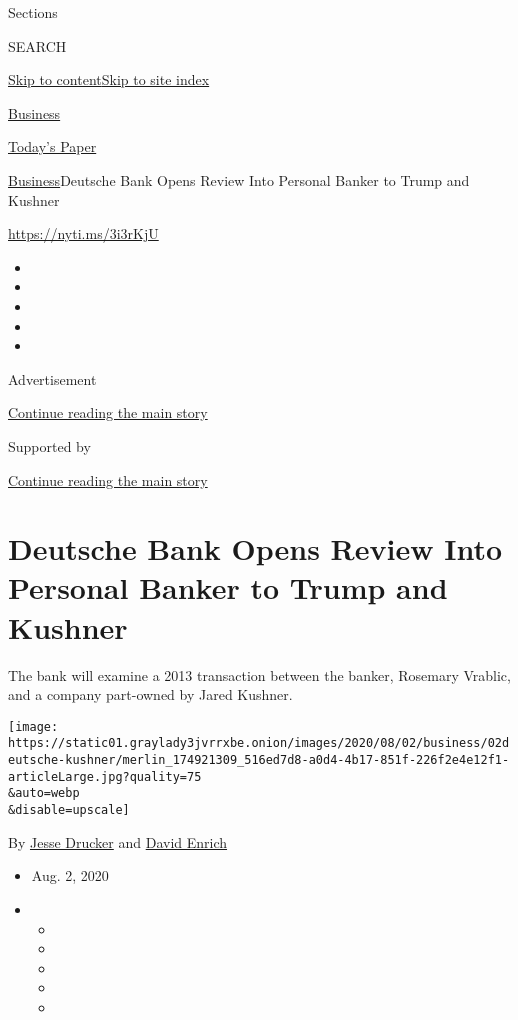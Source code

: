 Sections

SEARCH

\protect\hyperlink{site-content}{Skip to
content}\protect\hyperlink{site-index}{Skip to site index}

\href{https://www.nytimes3xbfgragh.onion/section/business}{Business}

\href{https://myaccount.nytimes3xbfgragh.onion/auth/login?response_type=cookie\&client_id=vi}{}

\href{https://www.nytimes3xbfgragh.onion/section/todayspaper}{Today's
Paper}

\href{/section/business}{Business}\textbar{}Deutsche Bank Opens Review
Into Personal Banker to Trump and Kushner

\url{https://nyti.ms/3i3rKjU}

\begin{itemize}
\item
\item
\item
\item
\item
\end{itemize}

Advertisement

\protect\hyperlink{after-top}{Continue reading the main story}

Supported by

\protect\hyperlink{after-sponsor}{Continue reading the main story}

\hypertarget{deutsche-bank-opens-review-into-personal-banker-to-trump-and-kushner}{%
\section{Deutsche Bank Opens Review Into Personal Banker to Trump and
Kushner}\label{deutsche-bank-opens-review-into-personal-banker-to-trump-and-kushner}}

The bank will examine a 2013 transaction between the banker, Rosemary
Vrablic, and a company part-owned by Jared Kushner.

\texttt{[image: https://static01.graylady3jvrrxbe.onion/images/2020/08/02/business/02deutsche-kushner/merlin\_174921309\_516ed7d8-a0d4-4b17-851f-226f2e4e12f1-articleLarge.jpg?quality=75\\\&auto=webp\\\&disable=upscale]}

By \href{https://www.nytimes3xbfgragh.onion/by/jesse-drucker}{Jesse
Drucker} and
\href{https://www.nytimes3xbfgragh.onion/by/david-enrich}{David Enrich}

\begin{itemize}
\item
  Aug. 2, 2020
\item
  \begin{itemize}
  \item
  \item
  \item
  \item
  \item
  \end{itemize}
\end{itemize}

